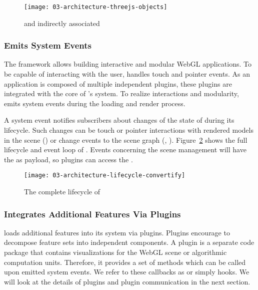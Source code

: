 \documentclass[../../ClassicThesis.tex]{subfiles}
\begin{document}
\begin{figure}[h]
  \centering
  \texttt{[image: 03-architecture-threejs-objects]}
  \caption{ and indirectly associated }
  \label{fig:nodes-and-three}
\end{figure}

\subsubsection{{\convertify} Emits System Events}
\label{convertify-emits-events}

The framework allows building interactive and modular WebGL
applications. To be capable of interacting with the user,
{\convertify} handles touch and pointer events. As an
application is composed of multiple independent plugins,
these plugins are integrated with the core of
{\convertify}'s system. To realize interactions and
modularity, {\convertify} emits system events during the
loading and render process.

A system event notifies subscribers about changes of the
state of {\convertify} during its lifecycle. Such changes
can be touch or pointer interactions with rendered models in
the scene () or change events to the
scene graph (, ).
Figure~\ref{fig:lifecycle} shows the full lifecycle and
event loop of {\convertify}. Events concerning the scene
management will have the  as payload, so plugins
can access the .

\begin{figure}[h]
  \centering
  \texttt{[image: 03-architecture-lifecycle-convertify]}
  \caption{The complete lifecycle of {\convertify}}
  \label{fig:lifecycle}
\end{figure}

\subsubsection{{\convertify} Integrates Additional Features
  Via Plugins}

{\convertify} loads additional features into its system via
plugins. Plugins encourage to decompose feature sets into
independent components. A plugin is a separate code package
that contains visualizations for the WebGL scene or
algorithmic computation units. Therefore, it provides a set
of methods which can be called upon emitted system events.
We refer to these callbacks as  or simply
hooks. We will look at the details of plugins and plugin
communication in the next section.
\end{document}
